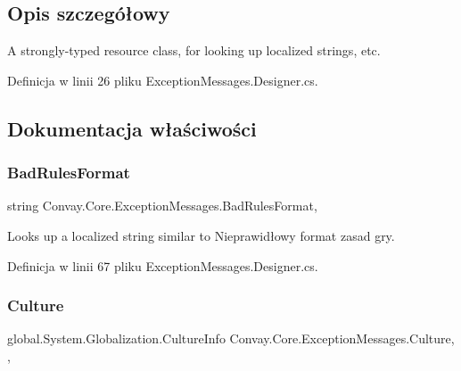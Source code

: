 \subsection{Opis szczegółowy}
A strongly-\/typed resource class, for looking up localized strings, etc. 



Definicja w linii 26 pliku Exception\+Messages.\+Designer.\+cs.



\subsection{Dokumentacja właściwości}
\hypertarget{class_convay_1_1_core_1_1_exception_messages_a9380387ac19ddf78f121ad20f2c52670}{}\label{class_convay_1_1_core_1_1_exception_messages_a9380387ac19ddf78f121ad20f2c52670} 
\subsubsection{\texorpdfstring{Bad\+Rules\+Format}{BadRulesFormat}}
{\footnotesize\ttfamily string Convay.\+Core.\+Exception\+Messages.\+Bad\+Rules\+Format\hspace{0.3cm}{\ttfamily [static]}, {\ttfamily [get]}}



Looks up a localized string similar to Nieprawidłowy format zasad gry. 



Definicja w linii 67 pliku Exception\+Messages.\+Designer.\+cs.

\hypertarget{class_convay_1_1_core_1_1_exception_messages_ae5e161e433a44df1737c230cdcf92ba3}{}\label{class_convay_1_1_core_1_1_exception_messages_ae5e161e433a44df1737c230cdcf92ba3} 
\subsubsection{\texorpdfstring{Culture}{Culture}}
{\footnotesize\ttfamily global.\+System.\+Globalization.\+Culture\+Info Convay.\+Core.\+Exception\+Messages.\+Culture\hspace{0.3cm}{\ttfamily [static]}, {\ttfamily [get]}, {\ttfamily [set]}}



